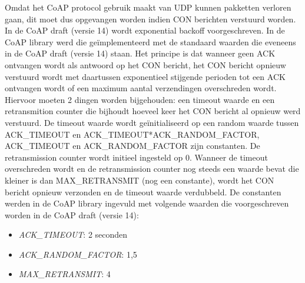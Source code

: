 Omdat het CoAP protocol gebruik maakt van UDP kunnen pakketten verloren gaan, dit moet dus opgevangen worden indien CON berichten verstuurd worden. In de CoAP draft (versie 14) wordt exponential backoff voorgeschreven. In de CoAP library werd die geïmplementeerd met de standaard waarden die eveneens in de CoAP draft (versie 14) staan. Het principe is dat wanneer geen ACK ontvangen wordt als antwoord op het CON bericht, het CON bericht opnieuw verstuurd wordt met daartussen exponentieel stijgende perioden tot een ACK ontvangen wordt of een maximum aantal verzendingen overschreden wordt. Hiervoor moeten 2 dingen worden bijgehouden: een timeout waarde en een retransmition counter die bijhoudt hoeveel keer het CON bericht al opnieuw werd verstuurd. De timeout waarde wordt ge\"{i}nitialiseerd op een random waarde tussen ACK\_TIMEOUT en ACK\_TIMEOUT*ACK\_RANDOM\_FACTOR, ACK\_TIMEOUT en ACK\_RANDOM\_FACTOR zijn constanten. De retransmission counter wordt initieel ingesteld op 0. Wanneer de timeout overschreden wordt en de retransmission counter nog steeds een waarde bevat die kleiner is dan MAX\_RETRANSMIT (nog een constante), wordt het CON bericht opnieuw verzonden en de timeout waarde verdubbeld. De constanten werden in de CoAP library ingevuld met volgende waarden die voorgeschreven worden in de CoAP draft (versie 14):
\begin{itemize}
\item \textit{ACK\_TIMEOUT}: 2 seconden
\item \textit{ACK\_RANDOM\_FACTOR}: 1,5
\item \textit{MAX\_RETRANSMIT}: 4
\end{itemize}






